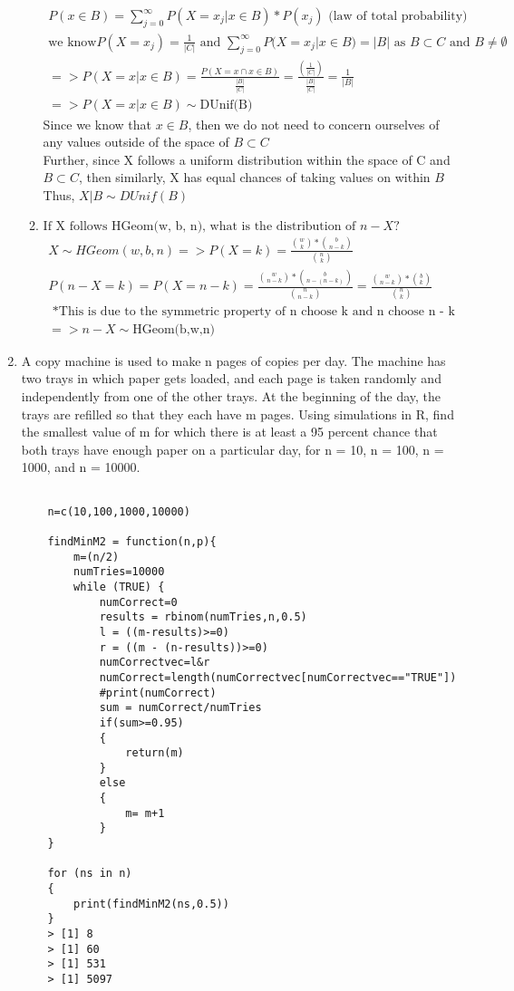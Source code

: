\documentclass[11pt]{article}
\begin{document}
\begin{enumerate}
\begin{enumerate}
\begin{gather}
		P(x \in B) = \sum_{j=0}^{\infty} P(X=x_j | x \in B)*P(x_j) \text{ (law of total probability)}\\
	\text{we know} P(X=x_j) = \frac{1}{|C|} \text{ and } \sum_{j=0}^{\infty} P(X=x_j | x \in B) = |B| \text{ as } B \subset C \text{ and } B \neq \emptyset \\
	=> P(X=x|x\in B) = \frac{P(X=x \cap x \in B)}{\frac{|B|}{|C|}} 
	=  \frac{(\frac{1}{|C|})}{\frac{|B|}{|C|}} = \frac{1}{|B|}\\
	=> P(X=x|x\in B) \sim \text{DUnif(B)}
	\end{gather}
	Since we know that $x \in B$, then we do not need to concern ourselves of any values outside of the space of $B \subset C$
	\\
	Further, since X follows a uniform distribution within the space of C and $B \subset C$, then similarly, X has equal chances of taking values on within $B$
	\\
	Thus, $X|B \sim DUnif(B)$
	\item  $\text{If X follows HGeom(w, b, n), what is the distribution of } n - X?$
	\begin{gather}
		 X ∼ HGeom(w, b, n) => P(X=k) = \frac{\binom{w}{k} * \binom{b}{n-k}}{\binom{n}{k}}\\
		 P(n-X=k) = P(X=n-k) = \frac{\binom{w}{n-k} * \binom{b}{n-(n-k)}}{\binom{n}{n-k}} = \frac{\binom{w}{n-k} * \binom{b}{k}}{\binom{n}{k}} \\
		 \text{ *This is due to the symmetric property of n choose k and n choose n - k}\\
		 =>n-X \sim \text{HGeom(b,w,n)}
	\end{gather}


\end{enumerate}
\item A copy machine is used to make n pages of copies per day. The machine has two trays in which paper gets
loaded, and each page is taken randomly and independently from one of the other trays. At the beginning
of the day, the trays are refilled so that they each have m pages. Using simulations in R, find the smallest
value of m for which there is at least a 95 percent chance that both trays have enough paper on a particular day,
for n = 10, n = 100, n = 1000, and n = 10000.
\begin{verbatim}

	n=c(10,100,1000,10000)

	findMinM2 = function(n,p){
		m=(n/2) 
		numTries=10000
		while (TRUE) {
			numCorrect=0
			results = rbinom(numTries,n,0.5)
			l = ((m-results)>=0)
			r = ((m - (n-results))>=0)
			numCorrectvec=l&r
			numCorrect=length(numCorrectvec[numCorrectvec=="TRUE"])
			#print(numCorrect)
			sum = numCorrect/numTries
			if(sum>=0.95)
			{
				return(m)
			}
			else
			{
				m= m+1
			}
	}
	
	for (ns in n)
	{
		print(findMinM2(ns,0.5))
	}
	> [1] 8
	> [1] 60
	> [1] 531
	> [1] 5097
\end{verbatim}

\end{enumerate}
\end{document}
